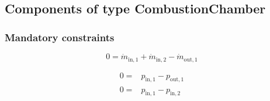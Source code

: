 \subsection{Components of type CombustionChamber}

\subsubsection{Mandatory constraints}

\begin{equation}
\label{eq:CombustionChamber_mass_flow_constraints}
0=\dot{m}_\mathrm{in,1} + \dot{m}_\mathrm{in,2} - \dot{m}_\mathrm{out,1}
\end{equation}

\begin{equation}
\label{eq:CombustionChamber_reactor_pressure_constraints}
\begin{split}
0 = & p_\mathrm{in,1} - p_\mathrm{out,1}\\
0 = & p_\mathrm{in,1} - p_\mathrm{in,2}\\
\end{split}
\end{equation}

